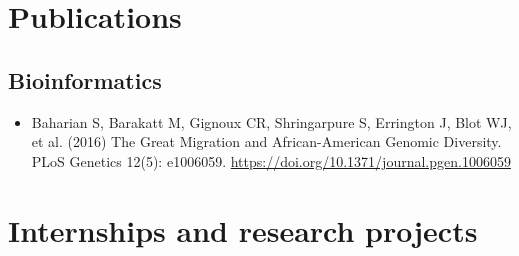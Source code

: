 \documentclass[11pt,letterpaper]{article}
\begin{document}
\section{Publications}

\subsection{Bioinformatics}

\begin{itemize}
  \item
    Baharian S, Barakatt M, Gignoux CR, Shringarpure S, Errington J, Blot WJ,
    et al. (2016) The Great Migration and African-American Genomic Diversity.
    PLoS Genetics 12(5): e1006059.
    \url{https://doi.org/10.1371/journal.pgen.1006059}
\end{itemize}

\section{Internships and research projects}
\end{document}
